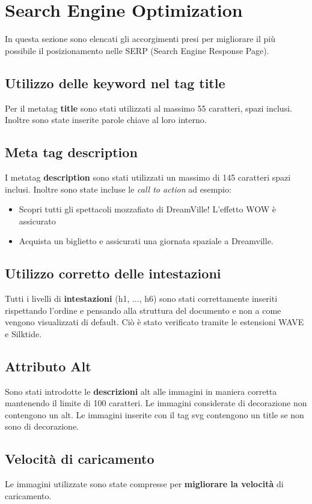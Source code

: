 \section{Search Engine Optimization}
In questa sezione sono elencati gli accorgimenti presi per migliorare il più possibile il posizionamento nelle SERP (Search Engine Response Page).
\subsection{Utilizzo delle keyword nel tag title}
Per il metatag \textbf{title} sono stati utilizzati al massimo 55 caratteri, spazi inclusi. Inoltre sono state inserite parole chiave al loro interno.
\subsection{Meta tag description}
I metatag \textbf{description} sono stati utilizzati un massimo di 145 caratteri spazi inclusi. Inoltre sono state incluse le \textit{call to action} ad esempio: 
\begin{itemize}
    \item Scopri tutti gli spettacoli mozzafiato di DreamVille! L'effetto WOW è assicurato
    \item Acquista un biglietto e assicurati una giornata spaziale a Dreamville.
\end{itemize}
\subsection{Utilizzo corretto delle intestazioni}
Tutti i livelli di \textbf{intestazioni} (h1, ..., h6) sono stati correttamente inseriti rispettando l'ordine e pensando alla struttura del documento e non a come vengono visualizzati di default. Ciò è stato verificato tramite le estensioni WAVE e Silktide.
\subsection{Attributo Alt}
Sono stati introdotte le \textbf{descrizioni} alt alle immagini in maniera corretta mantenendo il limite di 100 caratteri. Le immagini considerate di decorazione non contengono un alt. Le immagini inserite con il tag svg contengono un title se non sono di decorazione.
\subsection{Velocità di caricamento}
Le immagini utilizzate sono state compresse per \textbf{migliorare la velocità} di caricamento.
